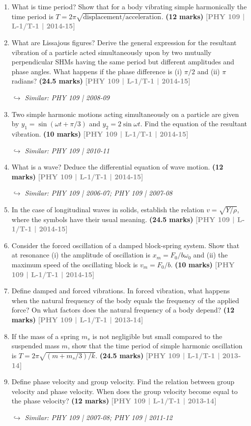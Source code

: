 \documentclass[12pt,a3paper]{article}
\newcommand{\yr}[1]{\hfill\textcolor{gray}{\small\textbf{[#1]}}}
\newcommand{\mk}[1]{\textcolor{orange!70!black}{\small\textbf{(#1 marks)}}}
\newcommand{\variant}[1]{\par\vspace{1pt}\textcolor{blue!50!black}%
  {\footnotesize\textit{$\hookrightarrow$ Similar: #1}}}
\begin{document}
\begin{enumerate}
\item What is time period? Show that for a body vibrating simple harmonically the time period is $T = 2\pi\sqrt{\text{displacement}/\text{acceleration}}$.
\mk{12} \yr{PHY 109 | L-1/T-1 | 2014-15}

\item What are Lissajous figures? Derive the general expression for the resultant vibration of a particle acted simultaneously upon by two mutually perpendicular SHMs having the same period but different amplitudes and phase angles. What happens if the phase difference is (i) $\pi/2$ and (ii) $\pi$ radians?
\mk{24.5} \yr{PHY 109 | L-1/T-1 | 2014-15}
\variant{PHY 109 | 2008-09}

\item Two simple harmonic motions acting simultaneously on a particle are given by $y_1 = \sin(\omega t + \pi/3)$ and $y_2 = 2\sin\omega t$. Find the equation of the resultant vibration.
\mk{10} \yr{PHY 109 | L-1/T-1 | 2014-15}
\variant{PHY 109 | 2010-11}

\item What is a wave? Deduce the differential equation of wave motion.
\mk{12} \yr{PHY 109 | L-1/T-1 | 2014-15}
\variant{PHY 109 | 2006-07; PHY 109 | 2007-08}

\item In the case of longitudinal waves in solids, establish the relation $v = \sqrt{Y/\rho}$, where the symbols have their usual meaning.
\mk{24.5} \yr{PHY 109 | L-1/T-1 | 2014-15}

\item Consider the forced oscillation of a damped block-spring system. Show that at resonance (i) the amplitude of oscillation is $x_m = F_0/b\omega_0$ and (ii) the maximum speed of the oscillating block is $v_m = F_0/b$.
\mk{10} \yr{PHY 109 | L-1/T-1 | 2014-15}

\item Define damped and forced vibrations. In forced vibration, what happens when the natural frequency of the body equals the frequency of the applied force? On what factors does the natural frequency of a body depend?
\mk{12} \yr{PHY 109 | L-1/T-1 | 2013-14}

\item If the mass of a spring $m_s$ is not negligible but small compared to the suspended mass $m$, show that the time period of simple harmonic oscillation is $T = 2\pi\sqrt{(m + m_s/3)/k}$.
\mk{24.5} \yr{PHY 109 | L-1/T-1 | 2013-14}

\item Define phase velocity and group velocity. Find the relation between group velocity and phase velocity. When does the group velocity become equal to the phase velocity?
\mk{12} \yr{PHY 109 | L-1/T-1 | 2013-14}
\variant{PHY 109 | 2007-08; PHY 109 | 2011-12}


\end{enumerate}
\end{document}
